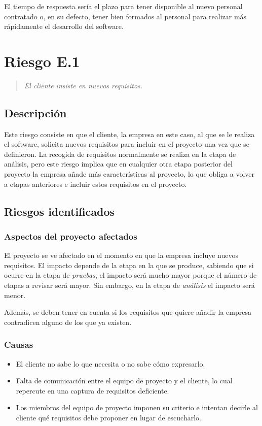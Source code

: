 \documentclass[11pt,a4paper,spanish,twoside]{book}
\begin{document}
El tiempo de respuesta sería el plazo para tener disponible al nuevo
personal contratado o, en su defecto, tener bien formados al personal para
realizar más rápidamente el desarrollo del software.

\section{Riesgo E.1}
\begin{quote}
  \emph{El cliente insiste en nuevos requisitos.}
\end{quote}

\subsection{Descripción}
Este riesgo consiste en que el cliente, la empresa en este caso, al que se le 
realiza el software, solicita nuevos requisitos para incluir en el proyecto 
una vez que se definieron. La recogida de requisitos normalmente se realiza
en la etapa de análisis, pero este riesgo implica que en cualquier otra etapa
posterior del proyecto la empresa añade más características al proyecto, lo que 
obliga a volver a etapas anteriores e incluir estos requisitos en el
proyecto.

\subsection{Riesgos identificados}
\subsubsection{Aspectos del proyecto afectados}
El proyecto se ve afectado en el momento en que la empresa incluye nuevos
requisitos. El impacto depende de la etapa en la que se produce, sabiendo que 
si ocurre en la etapa de \emph{pruebas}, el impacto será mucho mayor porque
el número de etapas a revisar será mayor. Sin embargo, en la etapa de
\emph{análisis} el impacto será menor. 

Además, se deben tener en cuenta si los requisitos que quiere añadir la
empresa contradicen alguno de los que ya existen. 

\subsubsection{Causas}
\begin{itemize}
\item El cliente no sabe lo que necesita o no sabe cómo expresarlo.
\item Falta de comunicación entre el equipo de proyecto y el cliente, lo cual 
  repercute en una captura de requisitos deficiente.
\item Los miembros del equipo de proyecto imponen su criterio e intentan
  decirle al cliente qué requisitos debe proponer en lugar de escucharlo.
\end{itemize}
\end{document}
